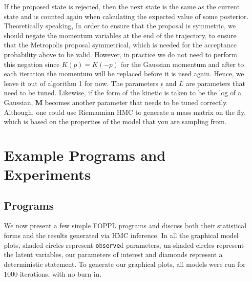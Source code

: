\documentclass[twoside]{article}
\begin{document}
If the proposed state is rejected, then the next state is the same as the current state and is counted again when calculating the expected value of some posterior. 
Theoretically speaking, In order to ensure that the proposal is symmetric, we should negate the momentum variables at the end of the trajectory, to ensure that the Metropolis proposal symmetrical, which is needed for the acceptance probability above to be valid. However, in practice we do not need to perform this negation since $K(p) = K(-p)$ for the Gaussian momentum and after to each iteration the momentum will be replaced before it is used again. Hence, we leave it out of algorithm 1 for now. 
The parameters  $\epsilon$ and $L$ are parameters that need to be tuned. Likewise, if the form of the kinetic is taken to be the log of a Gaussian, $\textbf{M}$ becomes another parameter that needs to be tuned correctly. Although, one could use Riemannian HMC \citep{girolami2011riemann} to generate a mass matrix on the fly, which is based on the properties of the model that you are sampling from.

\section{Example Programs and Experiments}
\label{sec:exampprog}
\subsection{Programs}

We now present a few simple FOPPL programs and discuss both their statistical forms and the results generated via HMC inference. In all the graphical model plots, shaded circles represent \texttt{observe}d parameters, un-shaded circles represent the latent variables, our parameters of interest and diamonds represent a deterministic statement. To generate our graphical plots, all models were run for 1000 iterations, with no burn in.  
\end{document}
